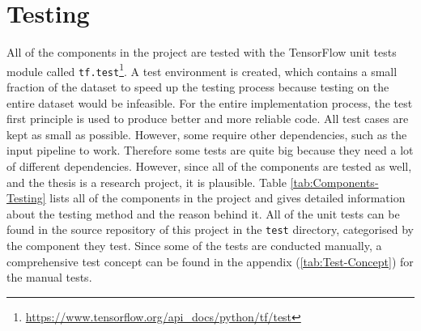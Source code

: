 \section{Testing}
\label{sec:Testing}
All of the components in the project are tested with the TensorFlow unit tests module called \texttt{tf.test}\footnote{\url{https://www.tensorflow.org/api_docs/python/tf/test}}. A test environment is created, which contains a small fraction of the dataset to speed up the testing process because testing on the entire dataset would be infeasible. For the entire implementation process, the test first principle is used to produce better and more reliable code. All test cases are kept as small as possible. However, some require other dependencies, such as the input pipeline to work. Therefore some tests are quite big because they need a lot of different dependencies. However, since all of the components are tested as well, and the thesis is a research project, it is plausible.
\newline
\newline
Table \ref{tab:Components-Testing} lists all of the components in the project and gives detailed information about the testing method and the reason behind it. All of the unit tests can be found in the source repository of this project in the \texttt{test} directory, categorised by the component they test. Since some of the tests are conducted manually, a comprehensive test concept can be found in the appendix (\ref{tab:Test-Concept}) for the manual tests.
